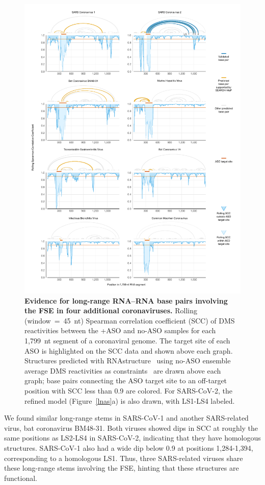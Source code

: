 \documentclass[main.tex]{subfiles}
\begin{document}
\begin{figure}[H]
	\includegraphics[width=\textwidth]{../MainFigures/covs/covs.pdf}
	\caption{\textbf{Evidence for long-range RNA--RNA base pairs involving the FSE in four additional coronaviruses.} Rolling (window~=~45~nt) Spearman correlation coefficient (SCC) of DMS reactivities between the +ASO and no-ASO samples for each 1,799~nt segment of a coronaviral genome. The target site of each ASO is highlighted on the SCC data and shown above each graph. Structures predicted with RNAstructure~\cite{Reuter2010} using no-ASO ensemble average DMS reactivities as constraints~\cite{Cordero2012} are drawn above each graph; base pairs connecting the ASO target site to an off-target position with SCC less than 0.9 are colored. For SARS-CoV-2, the refined model (Figure~\ref{lnas}a) is also drawn, with LS1-LS4 labeled.}
	\label{covs}
\end{figure}

We found similar long-range stems in SARS-CoV-1 and another SARS-related virus, bat coronavirus BM48-31.
Both viruses showed dips in SCC at roughly the same positions as LS2-LS4 in SARS-CoV-2, indicating that they have homologous structures.
SARS-CoV-1 also had a wide dip below 0.9 at positions 1,284-1,394, corresponding to a homologous LS1.
Thus, three SARS-related viruses share these long-range stems involving the FSE, hinting that these structures are functional.
\end{document}
